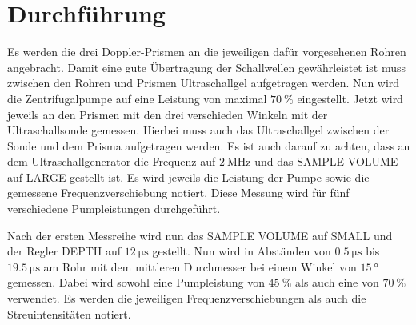 
\section{Durchführung}
\label{sec:Durchführung}
Es werden die drei Doppler-Prismen an die jeweiligen dafür vorgesehenen Rohren angebracht. Damit eine gute Übertragung der Schallwellen gewährleistet ist muss zwischen den Rohren und Prismen Ultraschallgel aufgetragen werden.  Nun wird die Zentrifugalpumpe auf eine Leistung von maximal $\SI{70}{\percent}$ eingestellt. Jetzt wird jeweils an den Prismen mit den drei verschieden Winkeln mit der Ultraschallsonde gemessen. Hierbei muss auch das Ultraschallgel zwischen der Sonde und dem Prisma aufgetragen werden. Es ist auch darauf zu achten, dass an dem Ultraschallgenerator die Frequenz auf $\SI{2}{\mega\hertz}$ und das SAMPLE VOLUME auf LARGE gestellt ist. Es wird jeweils die Leistung der Pumpe sowie die gemessene Frequenzverschiebung notiert. Diese Messung wird für fünf verschiedene Pumpleistungen durchgeführt.

Nach der ersten Messreihe wird nun das SAMPLE VOLUME auf SMALL und der Regler DEPTH auf $\SI{12}{\micro\second}$ gestellt. Nun wird in Abständen von $\SI{0.5}{\micro\second}$ bis $\SI{19.5}{\micro\second}$ am Rohr mit dem mittleren Durchmesser bei einem Winkel von $\SI{15}{\degree}$ gemessen. Dabei wird sowohl eine Pumpleistung von $\SI{45}{\percent}$ als auch eine von $\SI{70}{\percent}$ verwendet. Es werden die jeweiligen Frequenzverschiebungen als auch die Streuintensitäten notiert.